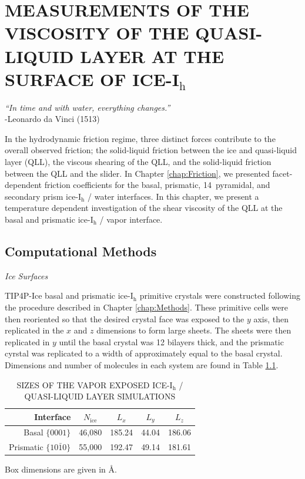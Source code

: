 \chapter{MEASUREMENTS OF THE VISCOSITY OF THE QUASI-LIQUID LAYER AT THE SURFACE OF ICE-I$_\mathrm{h}$}\label{chap:QLL}

\begin{flushright}
\textit{``In time and with water, everything changes.''} \\
-Leonardo da Vinci (1513) \\
\end{flushright}

In the hydrodynamic friction regime, three distinct forces contribute
to the overall observed friction; the solid-liquid friction between
the ice and quasi-liquid layer (QLL), the viscous shearing of the QLL,
and the solid-liquid friction between the QLL and the
slider.\cite{Kietzig2009,Kietzig2010} In Chapter \ref{chap:Friction},
we presented facet-dependent friction coefficients for the basal,
prismatic, 14\degree~pyramidal, and secondary prism ice-I$_\mathrm{h}$
/ water interfaces. In this chapter, we present a temperature
dependent investigation of the shear viscosity of the QLL at the basal
and prismatic ice-I$_\mathrm{h}$ / vapor interface.



\section{Computational Methods}

\begin{flushleft}
\textit{Ice Surfaces}
\end{flushleft}

TIP4P-Ice basal and prismatic ice-I$_\mathrm{h}$ primitive crystals
were constructed following the procedure described in Chapter
\ref{chap:Methods}. These primitive cells were then reoriented so that
the desired crystal face was exposed to the $y$ axis, then replicated
in the $x$ and $z$ dimensions to form large sheets. The sheets were
then replicated in $y$ until the basal crystal was 12 bilayers thick,
and the prismatic cyrstal was replicated to a width of approximately
equal to the basal crystal. Dimensions and number of molecules in each
system are found in Table \ref{tab:qll-method}.


\begin{table}[h]
\centering
\caption{SIZES OF THE VAPOR EXPOSED ICE-I$_\mathrm{h}$ / QUASI-LIQUID LAYER SIMULATIONS\label{tab:qll-method}}
\begin{tabular}{rcccc}
\hline
\hline
 Interface & $N_\mathrm{ice}$ & $L_x$ & $L_y$ & $L_z$ \\
\hline
Basal  $\{0001\}$                           & 46,080 & 185.24 & 44.04 & 186.06 \\
Prismatic  $\{10\bar{1}0\}$            & 55,000 & 192.47 & 49.14 & 181.61\\
\hline
\hline
\end{tabular}
\begin{flushleft}
Box dimensions are given in \AA.
\end{flushleft}
\end{table}



